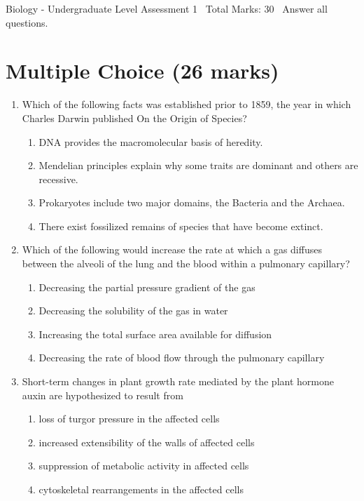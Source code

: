 \documentclass[12pt]{article}
\begin{document}
\begin{center}
Biology - Undergraduate Level Assessment 1 \
Total Marks: 30 \
Answer all questions.
\end{center}

\section*{Multiple Choice (26 marks)}
\begin{enumerate}[label=\arabic*.]
\item Which of the following facts was established prior to 1859, the year in which Charles Darwin published On the Origin of Species?
\begin{enumerate}[label=(\alph*)]
    \item DNA provides the macromolecular basis of heredity.
    \item Mendelian principles explain why some traits are dominant and others are recessive.
    \item Prokaryotes include two major domains, the Bacteria and the Archaea.
    \item There exist fossilized remains of species that have become extinct.
\end{enumerate}
\item Which of the following would increase the rate at which a gas diffuses between the alveoli of the lung and the blood within a pulmonary capillary?
\begin{enumerate}[label=(\alph*)]
    \item Decreasing the partial pressure gradient of the gas
    \item Decreasing the solubility of the gas in water
    \item Increasing the total surface area available for diffusion
    \item Decreasing the rate of blood flow through the pulmonary capillary
\end{enumerate}
\item Short-term changes in plant growth rate mediated by the plant hormone auxin are hypothesized to result from
\begin{enumerate}[label=(\alph*)]
    \item loss of turgor pressure in the affected cells
    \item increased extensibility of the walls of affected cells
    \item suppression of metabolic activity in affected cells
    \item cytoskeletal rearrangements in the affected cells

\end{enumerate}
\end{enumerate}
\end{document}
